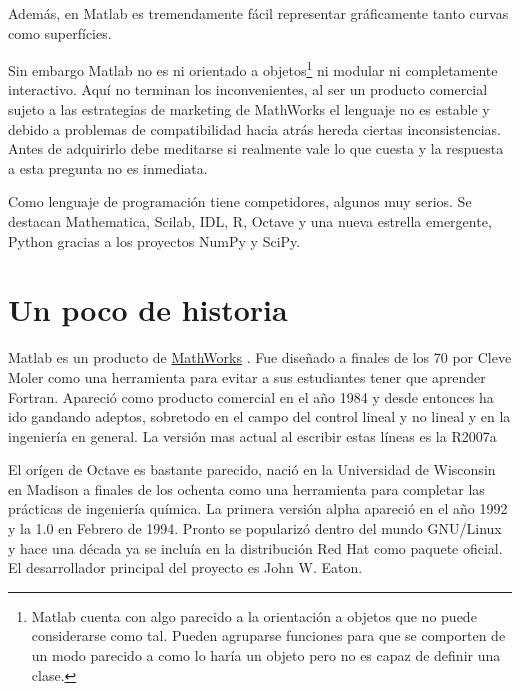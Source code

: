 \documentclass[10pt,letterpaper,conference]{ieeeconfspanish}
\begin{document}
Además, en Matlab es tremendamente fácil representar gráficamente
tanto curvas como superfícies.

Sin embargo Matlab no es ni orientado a objetos\footnote{Matlab cuenta
  con algo parecido a la orientación a objetos que no puede
  considerarse como tal.  Pueden agruparse funciones para que se
  comporten de un modo parecido a como lo haría un objeto pero no es
  capaz de definir una clase.} ni modular ni completamente
interactivo.  Aquí no terminan los inconvenientes, al ser un producto
comercial sujeto a las estrategias de marketing de MathWorks el
lenguaje no es estable y debido a problemas de compatibilidad hacia
atrás hereda ciertas inconsistencias.  Antes de adquirirlo debe
meditarse si realmente vale lo que cuesta y la respuesta a esta
pregunta no es inmediata.

Como lenguaje de programación tiene competidores, algunos muy serios.
Se destacan Mathematica, Scilab, IDL, R, Octave y una nueva estrella
emergente, Python gracias a los proyectos NumPy y SciPy.



\hypertarget{un-poco-de-historia}{}
\section*{Un poco de historia}

Matlab es un producto de \href{http://www.mathworks.com}{MathWorks} .  Fue diseñado a finales de los
70 por Cleve Moler como una herramienta para evitar a sus estudiantes
tener que aprender Fortran.  Apareció como producto comercial en el
año 1984 y desde entonces ha ido gandando adeptos, sobretodo en el
campo del control lineal y no lineal y en la ingeniería en general.
La versión mas actual al escribir estas líneas es la R2007a

El orígen de Octave es bastante parecido, nació en la Universidad de
Wisconsin en Madison a finales de los ochenta como una herramienta
para completar las prácticas de ingeniería química.  La primera
versión alpha apareció en el año 1992 y la 1.0 en Febrero de 1994.
Pronto se popularizó dentro del mundo GNU/Linux y hace una década ya
se incluía en la distribución Red Hat como paquete oficial.  El
desarrollador principal del proyecto es John W. Eaton.


\end{document}
